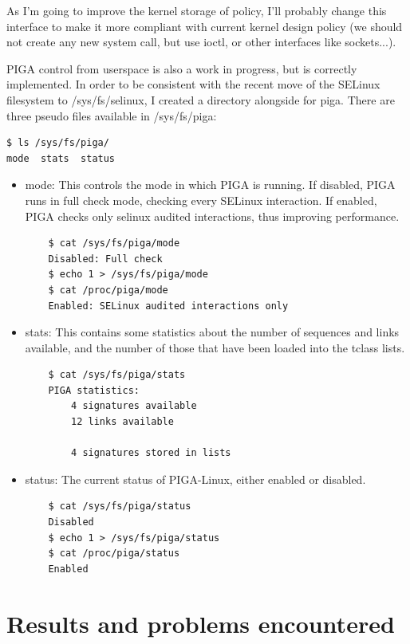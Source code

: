 \documentclass[pdftex,a4paper,titlepage,11pt]{article}
\begin{document}
\medskip

As I'm going to improve the kernel storage of policy, I'll probably change this
interface to make it more compliant with current kernel design policy (we should
not create any new system call, but use ioctl, or other interfaces like
sockets...).

\bigskip

PIGA control from userspace is also a work in progress, but is correctly
implemented. In order to be consistent with the recent move of the SELinux
filesystem to /sys/fs/selinux, I created a directory alongside for piga. There
are three pseudo files available in /sys/fs/piga:

\begin{lstlisting}
$ ls /sys/fs/piga/
mode  stats  status
\end{lstlisting}

\begin{itemize}
	\item mode: This controls the mode in which PIGA is running. If disabled,
PIGA runs in full check mode, checking every SELinux interaction. If enabled,
PIGA checks only selinux audited interactions, thus improving performance.
	\begin{lstlisting}
	$ cat /sys/fs/piga/mode
	Disabled: Full check
	$ echo 1 > /sys/fs/piga/mode
	$ cat /proc/piga/mode
	Enabled: SELinux audited interactions only
	\end{lstlisting}
	\item stats: This contains some statistics about the number of sequences and
links available, and the number of those that have been loaded into the tclass
lists.
	\begin{lstlisting}
	$ cat /sys/fs/piga/stats
	PIGA statistics:
		4 signatures available
		12 links available

		4 signatures stored in lists
	\end{lstlisting}
	\item status: The current status of PIGA-Linux, either enabled or disabled.
	\begin{lstlisting}
	$ cat /sys/fs/piga/status
	Disabled
	$ echo 1 > /sys/fs/piga/status
	$ cat /proc/piga/status
	Enabled
	\end{lstlisting}
\end{itemize}

\newpage

\section{Results and problems encountered}
\end{document}
